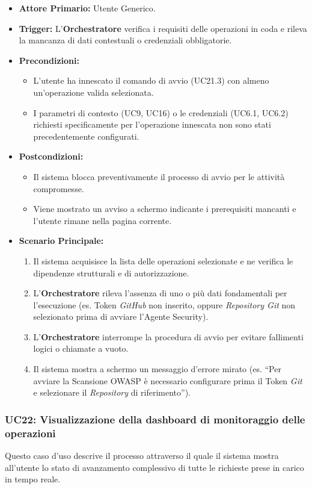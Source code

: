 \documentclass[12pt, a4paper]{article}
\begin{document}
\begin{itemize}
    \item \textbf{Attore Primario:} Utente Generico.
    \item \textbf{Trigger:} L'\textbf{Orchestratore} verifica i requisiti delle operazioni in coda e rileva la mancanza di dati contestuali o credenziali obbligatorie.
    \item \textbf{Precondizioni:}
    \begin{itemize}
        \item L'utente ha innescato il comando di avvio (UC21.3) con almeno un'operazione valida selezionata.
        \item I parametri di contesto (UC9, UC16) o le credenziali (UC6.1, UC6.2) richiesti specificamente per l'operazione innescata non sono stati precedentemente configurati.
    \end{itemize}
    \item \textbf{Postcondizioni:}
    \begin{itemize}
        \item Il sistema blocca preventivamente il processo di avvio per le attività compromesse.
        \item Viene mostrato un avviso a schermo indicante i prerequisiti mancanti e l'utente rimane nella pagina corrente.
    \end{itemize}
    \item \textbf{Scenario Principale:}
    \begin{enumerate}
        \item Il sistema acquisisce la lista delle operazioni selezionate e ne verifica le dipendenze strutturali e di autorizzazione.
        \item L'\textbf{Orchestratore} rileva l'assenza di uno o più dati fondamentali per l'esecuzione (es. Token \textit{GitHub} non inserito, oppure \textit{Repository Git} non selezionato prima di avviare l'Agente Security).
        \item L'\textbf{Orchestratore} interrompe la procedura di avvio per evitare fallimenti logici o chiamate a vuoto.
        \item Il sistema mostra a schermo un messaggio d'errore mirato (es. ``Per avviare la Scansione OWASP è necessario configurare prima il Token \textit{Git} e selezionare il \textit{Repository} di riferimento'').
    \end{enumerate}
\end{itemize}

\subsubsection{UC22: Visualizzazione della dashboard di monitoraggio delle operazioni}\label{uc:22}
Questo caso d'uso descrive il processo attraverso il quale il sistema mostra all'utente lo stato di avanzamento complessivo di tutte le richieste prese in carico in tempo reale.
\end{document}
